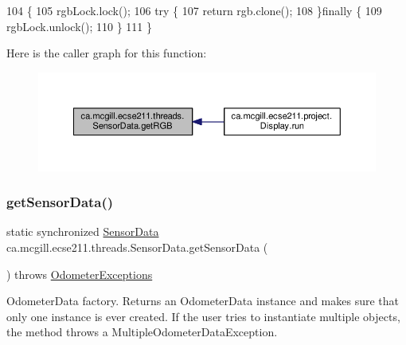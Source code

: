 \begin{DoxyCode}
104                         \{
105     rgbLock.lock();
106     \textcolor{keywordflow}{try} \{
107       \textcolor{keywordflow}{return} rgb.clone();
108     \}\textcolor{keywordflow}{finally} \{
109       rgbLock.unlock();
110     \}
111   \}
\end{DoxyCode}
Here is the caller graph for this function\+:
\nopagebreak
\begin{figure}[H]
\begin{center}
\leavevmode
\includegraphics[width=350pt]{classca_1_1mcgill_1_1ecse211_1_1threads_1_1_sensor_data_a76313564e284f5cdb66aefce4e595f3b_icgraph}
\end{center}
\end{figure}
\mbox{\label{classca_1_1mcgill_1_1ecse211_1_1threads_1_1_sensor_data_a8260aba53b4474ca1275e4ce26157977}} 
\subsubsection{\texorpdfstring{get\+Sensor\+Data()}{getSensorData()}}
{\footnotesize\ttfamily static synchronized \hyperlink{classca_1_1mcgill_1_1ecse211_1_1threads_1_1_sensor_data}{Sensor\+Data} ca.\+mcgill.\+ecse211.\+threads.\+Sensor\+Data.\+get\+Sensor\+Data (\begin{DoxyParamCaption}{ }\end{DoxyParamCaption}) throws \hyperlink{classca_1_1mcgill_1_1ecse211_1_1odometer_1_1_odometer_exceptions}{Odometer\+Exceptions}\hspace{0.3cm}{\ttfamily [static]}}

Odometer\+Data factory. Returns an Odometer\+Data instance and makes sure that only one instance is ever created. If the user tries to instantiate multiple objects, the method throws a Multiple\+Odometer\+Data\+Exception.

